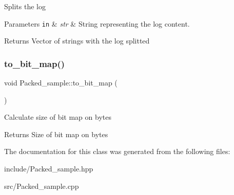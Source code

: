 Splits the log


\begin{DoxyParams}[1]{Parameters}
\mbox{\tt in}  & {\em str} & String representing the log content. \\
\hline
\end{DoxyParams}
\begin{DoxyReturn}{Returns}
Vector of strings with the log splitted 
\end{DoxyReturn}
\mbox{\label{classPacked__sample_ab2f6161820109568b4eb1da0b32c2b11}} 
\subsubsection{\texorpdfstring{to\+\_\+bit\+\_\+map()}{to\_bit\_map()}}
{\footnotesize\ttfamily void Packed\+\_\+sample\+::to\+\_\+bit\+\_\+map (\begin{DoxyParamCaption}{ }\end{DoxyParamCaption})}

Calculate size of bit map on bytes

\begin{DoxyReturn}{Returns}
Size of bit map on bytes 
\end{DoxyReturn}


The documentation for this class was generated from the following files\+:\begin{DoxyCompactItemize}
\item 
include/Packed\+\_\+sample.\+hpp\item 
src/Packed\+\_\+sample.\+cpp\end{DoxyCompactItemize}
